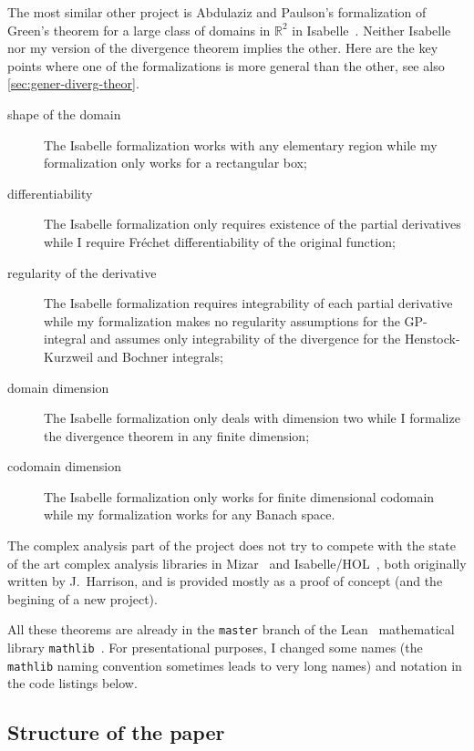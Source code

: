 \documentclass[a4paper, UKenglish,cleveref, autoref, thm-restate]{lipics-v2021}
\newcommand{\bbR}{\mathbb{R}}
\begin{document}
The most similar other project is Abdulaziz and Paulson's
formalization of Green's theorem for a large class of domains in
\(\bbR^{2}\) in Isabelle~\cite{Abdulaziz_Paulson}. Neither Isabelle
nor my version of the divergence theorem implies the other. Here are
the key points where one of the formalizations is more general than
the other, see also \autoref{sec:gener-diverg-theor}.

\begin{description}
\item[shape of the domain] The Isabelle formalization works with any
  elementary region while my formalization only works for a
  rectangular box;
\item[differentiability] The Isabelle formalization only requires
  existence of the partial derivatives while I require Fréchet
  differentiability of the original function;
\item[regularity of the derivative] The Isabelle formalization requires
  integrability of each partial derivative while my formalization
  makes no regularity assumptions for the GP-integral and assumes only
  integrability of the divergence for the Henstock-Kurzweil and
  Bochner integrals;
\item[domain dimension] The Isabelle formalization only deals with
  dimension two while I formalize the divergence theorem in any finite
  dimension;
\item[codomain dimension] The Isabelle formalization only works for
  finite dimensional codomain while my formalization works for any
  Banach space.
\end{description}

The complex analysis part of the project does not try to compete with
the state of the art complex analysis libraries in
Mizar~\cite{harrison-mizar} and Isabelle/HOL~\cite{harrison-hol}, both
originally written by J.~Harrison, and is provided mostly as a proof
of concept (and the begining of a new project).

All these theorems are already in the \texttt{master} branch of the
Lean~\cite{10.1007/978-3-319-21401-6_26} mathematical library
\texttt{mathlib}~\cite{mathlib20}. For presentational purposes, I
changed some names (the \texttt{mathlib} naming convention sometimes
leads to very long names) and notation in the code listings below.


\subsection{Structure of the paper}%
\label{sec:structure-paper}
\end{document}
